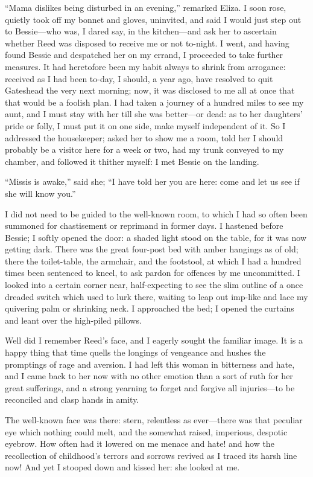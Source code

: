 \enquote{Mama dislikes being disturbed in an evening,} remarked Eliza.
I soon rose, quietly took off my bonnet and gloves, uninvited, and said
I would just step out to Bessie---who was, I dared say, in the
kitchen---and ask her to ascertain whether \Mrs{} Reed was disposed to
receive me or not to-night. I went, and having found Bessie and
despatched her on my errand, I proceeded to take further measures. It
had heretofore been my habit always to shrink from arrogance: received
as I had been to-day, I should, a year ago, have resolved to quit
Gateshead the very next morning; now, it was disclosed to me all at once
that that would be a foolish plan. I had taken a journey of a hundred
miles to see my aunt, and I must stay with her till she was better---or
dead: as to her daughters' pride or folly, I must put it on one side,
make myself independent of it. So I addressed the housekeeper; asked
her to show me a room, told her I should probably be a visitor here for
a week or two, had my trunk conveyed to my chamber, and followed it
thither myself: I met Bessie on the landing.

\enquote{Missis is awake,} said she; \enquote{I have told her you are
	here: come and let us see if she will know you.}

I did not need to be guided to the well-known room, to which I had so
often been summoned for chastisement or reprimand in former days. I
hastened before Bessie; I softly opened the door: a shaded light stood
on the table, for it was now getting dark. There was the great
four-post bed with amber hangings as of old; there the toilet-table, the
armchair, and the footstool, at which I had a hundred times been
sentenced to kneel, to ask pardon for offences by me uncommitted. I
looked into a certain corner near, half-expecting to see the slim
outline of a once dreaded switch which used to lurk there, waiting to
leap out imp-like and lace my quivering palm or shrinking neck. I
approached the bed; I opened the curtains and leant over the high-piled
pillows.

Well did I remember \Mrs{} Reed's face, and I eagerly sought the familiar
image. It is a happy thing that time quells the longings of vengeance
and hushes the promptings of rage and aversion. I had left this woman
in bitterness and hate, and I came back to her now with no other emotion
than a sort of ruth for her great sufferings, and a strong yearning to
forget and forgive all injuries---to be reconciled and clasp hands in
amity.

The well-known face was there: stern, relentless as ever---there was
that peculiar eye which nothing could melt, and the somewhat raised,
imperious, despotic eyebrow. How often had it lowered on me menace and
hate! and how the recollection of childhood's terrors and sorrows
revived as I traced its harsh line now! And yet I stooped down and
kissed her: she looked at me.

